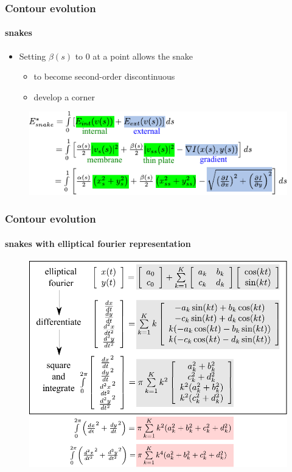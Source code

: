 \begin{frame}
\frametitle{Contour evolution}
\framesubtitle{snakes}
\logoCSIPCPL\mypagenum
	\begin{itemize}
		\item Setting $\beta(s)$ to 0 at a point allows the snake
			\begin{itemize}
				\item to become second-order discontinuous
				\item develop a corner
			\end{itemize}
	\end{itemize}
	\begin{figure}
		\includegraphics[width=1.0\textwidth]{figs/theory_curves_snakes.pdf}
	\end{figure}
\end{frame}


\begin{frame}
\frametitle{Contour evolution}
\framesubtitle{snakes with elliptical fourier representation}\logoCSIPCPL\mypagenum
	\begin{figure}
		\includegraphics[width=1.0\textwidth]{figs/theory_curves_ellipticalFourierSnakes.pdf}
	\end{figure}
\end{frame}




